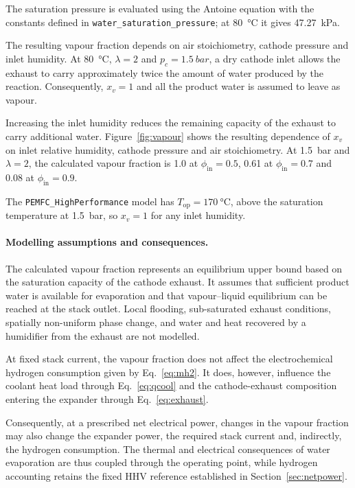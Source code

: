 \documentclass[a4paper,11pt]{article}
\newcommand{\code}[1]{\nolinkurl{#1}}
\newcommand{\fn}[1]{\nolinkurl{#1}}
\begin{document}
The saturation pressure is evaluated using the Antoine equation
with the constants defined in \fn{water_saturation_pressure};
at \SI{80}{\celsius} it gives \SI{47.27}{kPa}.

The resulting vapour fraction depends on air stoichiometry,
cathode pressure and inlet humidity. At \SI{80}{\celsius},
$\lambda=2$ and $p_c=\SI{1.5}{bar}$, a dry cathode inlet allows
the exhaust to carry approximately twice the amount of water
produced by the reaction. Consequently, $x_v=1$ and all the
product water is assumed to leave as vapour.

Increasing the inlet humidity reduces the remaining capacity
of the exhaust to carry additional water. Figure~\ref{fig:vapour}
shows the resulting dependence of $x_v$ on inlet relative humidity,
cathode pressure and air stoichiometry. At \SI{1.5}{bar} and
$\lambda=2$, the calculated vapour fraction is 1.0 at
$\phi_\mathrm{in}=0.5$, 0.61 at $\phi_\mathrm{in}=0.7$ and
0.08 at $\phi_\mathrm{in}=0.9$.

The \code{PEMFC_HighPerformance} model has
$T_\mathrm{op}=\SI{170}{\celsius}$, above the saturation
temperature at \SI{1.5}{bar}, so $x_v=1$ for any inlet humidity.

\paragraph{Modelling assumptions and consequences.}
The calculated vapour fraction represents an equilibrium
upper bound based on the saturation capacity of the cathode
exhaust. It assumes that sufficient product water is available
for evaporation and that vapour--liquid equilibrium can be
reached at the stack outlet. Local flooding, sub-saturated
exhaust conditions, spatially non-uniform phase change,
and water and heat recovered by a humidifier from the exhaust
are not modelled.

At fixed stack current, the vapour fraction does not affect
the electrochemical hydrogen consumption given by
Eq.~\eqref{eq:mh2}. It does, however, influence the coolant
heat load through Eq.~\eqref{eq:qcool} and the cathode-exhaust
composition entering the expander through Eq.~\eqref{eq:exhaust}.

Consequently, at a prescribed net electrical power, changes
in the vapour fraction may also change the expander power,
the required stack current and, indirectly, the hydrogen
consumption. The thermal and electrical consequences of
water evaporation are thus coupled through the operating
point, while hydrogen accounting retains the fixed HHV
reference established in Section~\ref{sec:netpower}.
\end{document}
